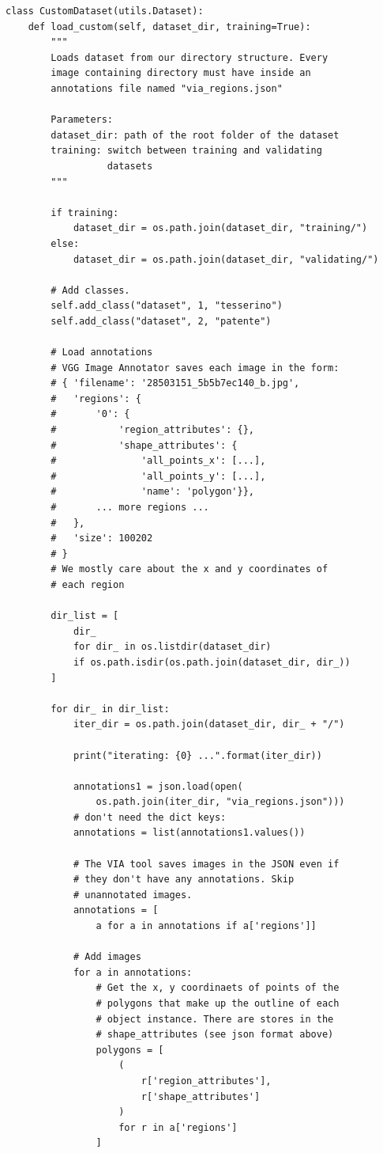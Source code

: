 \documentclass[12pt,a4paper]{article}
\begin{document}
\begin{verbatim}
class CustomDataset(utils.Dataset):
    def load_custom(self, dataset_dir, training=True):
        """
        Loads dataset from our directory structure. Every
        image containing directory must have inside an
        annotations file named "via_regions.json"

        Parameters:
        dataset_dir: path of the root folder of the dataset
        training: switch between training and validating
                  datasets
        """

        if training:
            dataset_dir = os.path.join(dataset_dir, "training/")
        else:
            dataset_dir = os.path.join(dataset_dir, "validating/")

        # Add classes.
        self.add_class("dataset", 1, "tesserino")
        self.add_class("dataset", 2, "patente")

        # Load annotations
        # VGG Image Annotator saves each image in the form:
        # { 'filename': '28503151_5b5b7ec140_b.jpg',
        #   'regions': {
        #       '0': {
        #           'region_attributes': {},
        #           'shape_attributes': {
        #               'all_points_x': [...],
        #               'all_points_y': [...],
        #               'name': 'polygon'}},
        #       ... more regions ...
        #   },
        #   'size': 100202
        # }
        # We mostly care about the x and y coordinates of
        # each region

        dir_list = [
            dir_
            for dir_ in os.listdir(dataset_dir)
            if os.path.isdir(os.path.join(dataset_dir, dir_))
        ]

        for dir_ in dir_list:
            iter_dir = os.path.join(dataset_dir, dir_ + "/")

            print("iterating: {0} ...".format(iter_dir))

            annotations1 = json.load(open(
                os.path.join(iter_dir, "via_regions.json")))
            # don't need the dict keys:
            annotations = list(annotations1.values())

            # The VIA tool saves images in the JSON even if
            # they don't have any annotations. Skip
            # unannotated images.
            annotations = [
                a for a in annotations if a['regions']]

            # Add images
            for a in annotations:
                # Get the x, y coordinaets of points of the
                # polygons that make up the outline of each
                # object instance. There are stores in the
                # shape_attributes (see json format above)
                polygons = [
                    (
                        r['region_attributes'],
                        r['shape_attributes']
                    )
                    for r in a['regions']
                ]


\end{verbatim}
\end{document}
